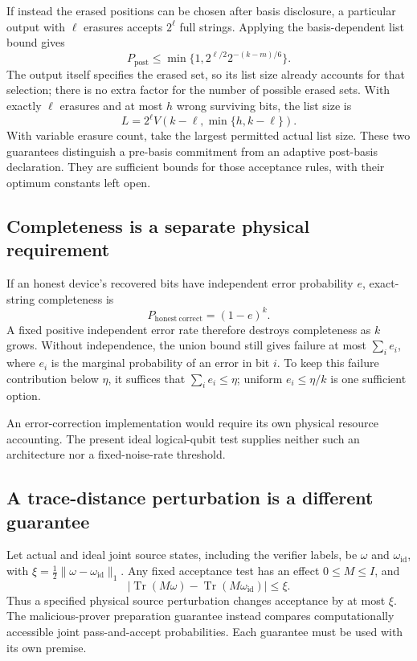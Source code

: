 \documentclass[11pt,a4paper]{article}
\newcommand{\Tr}{\operatorname{Tr}}
\begin{document}
If instead the erased positions can be chosen after basis disclosure, a particular output with $\ell$ erasures accepts $2^\ell$ full strings. Applying the basis-dependent list bound gives
\begin{equation}\label{eq:postloss}
P_{\mathrm{post}}
\leq\min\{1,2^{\ell/2}2^{-(k-m)/6}\}.
\end{equation}
The output itself specifies the erased set, so its list size already accounts for that selection; there is no extra factor for the number of possible erased sets. With exactly $\ell$ erasures and at most $h$ wrong surviving bits, the list size is
\[
L=2^\ell V(k-\ell,\min\{h,k-\ell\}).
\]
With variable erasure count, take the largest permitted actual list size. These two guarantees distinguish a pre-basis commitment from an adaptive post-basis declaration. They are sufficient bounds for those acceptance rules, with their optimum constants left open.

\subsection{Completeness is a separate physical requirement}
If an honest device's recovered bits have independent error probability $e$, exact-string completeness is
\[
P_{\mathrm{honest\ correct}}=(1-e)^k.
\]
A fixed positive independent error rate therefore destroys completeness as $k$ grows. Without independence, the union bound still gives failure at most $\sum_i e_i$, where $e_i$ is the marginal probability of an error in bit $i$. To keep this failure contribution below $\eta$, it suffices that $\sum_i e_i\leq\eta$; uniform $e_i\leq\eta/k$ is one sufficient option.

An error-correction implementation would require its own physical resource accounting. The present ideal logical-qubit test supplies neither such an architecture nor a fixed-noise-rate threshold.

\subsection{A trace-distance perturbation is a different guarantee}
Let actual and ideal joint source states, including the verifier labels, be $\omega$ and $\omega_{\mathrm{id}}$, with $\xi=\tfrac12\lVert\omega-\omega_{\mathrm{id}}\rVert_1$. Any fixed acceptance test has an effect $0\leq M\leq I$, and
\[
\left|\Tr(M\omega)-\Tr(M\omega_{\mathrm{id}})\right|\leq\xi.
\]
Thus a specified physical source perturbation changes acceptance by at most $\xi$. The malicious-prover preparation guarantee instead compares computationally accessible joint pass-and-accept probabilities. Each guarantee must be used with its own premise.
\end{document}
